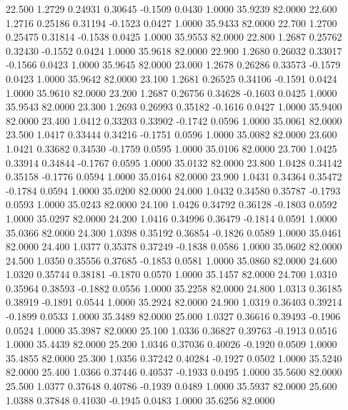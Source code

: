   22.500   1.2729   0.24931   0.30645  -0.1509   0.0430   1.0000  35.9239  82.0000
  22.600   1.2716   0.25186   0.31194  -0.1523   0.0427   1.0000  35.9433  82.0000
  22.700   1.2700   0.25475   0.31814  -0.1538   0.0425   1.0000  35.9553  82.0000
  22.800   1.2687   0.25762   0.32430  -0.1552   0.0424   1.0000  35.9618  82.0000
  22.900   1.2680   0.26032   0.33017  -0.1566   0.0423   1.0000  35.9645  82.0000
  23.000   1.2678   0.26286   0.33573  -0.1579   0.0423   1.0000  35.9642  82.0000
  23.100   1.2681   0.26525   0.34106  -0.1591   0.0424   1.0000  35.9610  82.0000
  23.200   1.2687   0.26756   0.34628  -0.1603   0.0425   1.0000  35.9543  82.0000
  23.300   1.2693   0.26993   0.35182  -0.1616   0.0427   1.0000  35.9400  82.0000
  23.400   1.0412   0.33203   0.33902  -0.1742   0.0596   1.0000  35.0061  82.0000
  23.500   1.0417   0.33444   0.34216  -0.1751   0.0596   1.0000  35.0082  82.0000
  23.600   1.0421   0.33682   0.34530  -0.1759   0.0595   1.0000  35.0106  82.0000
  23.700   1.0425   0.33914   0.34844  -0.1767   0.0595   1.0000  35.0132  82.0000
  23.800   1.0428   0.34142   0.35158  -0.1776   0.0594   1.0000  35.0164  82.0000
  23.900   1.0431   0.34364   0.35472  -0.1784   0.0594   1.0000  35.0200  82.0000
  24.000   1.0432   0.34580   0.35787  -0.1793   0.0593   1.0000  35.0243  82.0000
  24.100   1.0426   0.34792   0.36128  -0.1803   0.0592   1.0000  35.0297  82.0000
  24.200   1.0416   0.34996   0.36479  -0.1814   0.0591   1.0000  35.0366  82.0000
  24.300   1.0398   0.35192   0.36854  -0.1826   0.0589   1.0000  35.0461  82.0000
  24.400   1.0377   0.35378   0.37249  -0.1838   0.0586   1.0000  35.0602  82.0000
  24.500   1.0350   0.35556   0.37685  -0.1853   0.0581   1.0000  35.0860  82.0000
  24.600   1.0320   0.35744   0.38181  -0.1870   0.0570   1.0000  35.1457  82.0000
  24.700   1.0310   0.35964   0.38593  -0.1882   0.0556   1.0000  35.2258  82.0000
  24.800   1.0313   0.36185   0.38919  -0.1891   0.0544   1.0000  35.2924  82.0000
  24.900   1.0319   0.36403   0.39214  -0.1899   0.0533   1.0000  35.3489  82.0000
  25.000   1.0327   0.36616   0.39493  -0.1906   0.0524   1.0000  35.3987  82.0000
  25.100   1.0336   0.36827   0.39763  -0.1913   0.0516   1.0000  35.4439  82.0000
  25.200   1.0346   0.37036   0.40026  -0.1920   0.0509   1.0000  35.4855  82.0000
  25.300   1.0356   0.37242   0.40284  -0.1927   0.0502   1.0000  35.5240  82.0000
  25.400   1.0366   0.37446   0.40537  -0.1933   0.0495   1.0000  35.5600  82.0000
  25.500   1.0377   0.37648   0.40786  -0.1939   0.0489   1.0000  35.5937  82.0000
  25.600   1.0388   0.37848   0.41030  -0.1945   0.0483   1.0000  35.6256  82.0000
